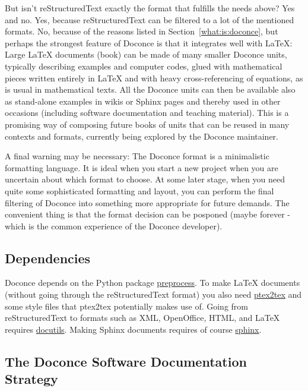 \documentclass{article}
\begin{document}
But isn't reStructuredText exactly the format that fulfills the needs
above? Yes and no. Yes, because reStructuredText can be filtered to a
lot of the mentioned formats. No, because of the reasons listed
in Section~\ref{what:is:doconce}, but perhaps the strongest feature
of Doconce is that it integrates well with {\LaTeX}: Large {\LaTeX} documents (book)
can be made of many smaller Doconce units, typically describing examples
and computer codes, glued with mathematical pieces written entirely
in {\LaTeX} and with heavy cross-referencing of equations, as is usual
in mathematical texts. All the Doconce units can then be available
also as stand-alone examples in wikis or Sphinx pages and thereby used
in other occasions (including software documentation and teaching material).
This is a promising way of composing future books of units that can
be reused in many contexts and formats, currently being explored by
the Doconce maintainer.

A final warning may be necessary: The Doconce format is a minimalistic
formatting language. It is ideal when you start a new project when you
are uncertain about which format to choose. At some later stage, when
you need quite some sophisticated formatting and layout, you can
perform the final filtering of Doconce into something more appropriate
for future demands. The convenient thing is that the format decision
can be posponed (maybe forever - which is the common experience of the
Doconce developer).

\subsection{Dependencies}

Doconce depends on the Python package
\href{http://code.google.com/p/preprocess/}{preprocess}.  To make {\LaTeX}
documents (without going through the reStructuredText format) you also
need \href{http://code.google.com/p/ptex2tex}{ptex2tex} and some style files
that ptex2tex potentially makes use of.  Going from reStructuredText
to formats such as XML, OpenOffice, HTML, and {\LaTeX} requires
\href{http://docutils.sourceforge.net/}{docutils}.  Making Sphinx documents
requires of course \href{http://sphinx.pocoo.org}{sphinx}.

\subsection{The Doconce Software Documentation Strategy}

\label{doconce:strategy}
\end{document}
